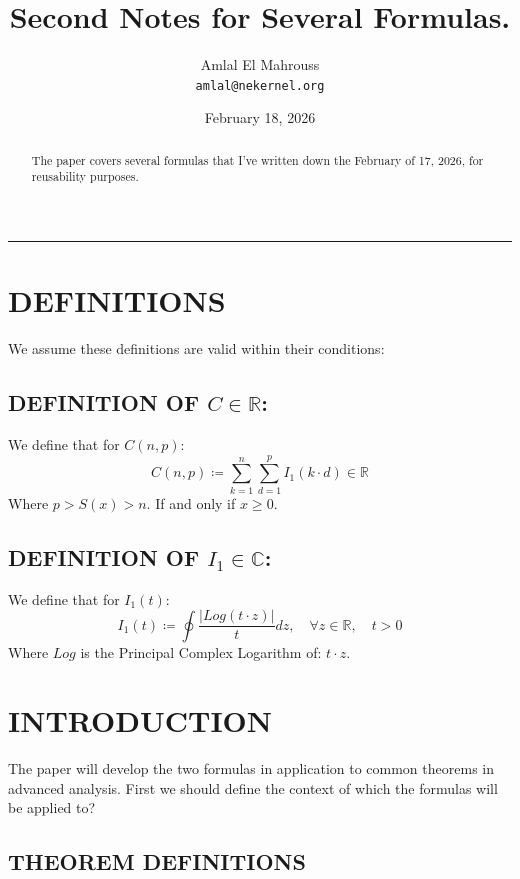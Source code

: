 \documentclass[11pt, a4paper]{article}
\title{Second Notes for Several Formulas.}
\author{Amlal El Mahrouss\\\texttt{amlal@nekernel.org}}
\date{February 18, 2026}
\begin{document}
\maketitle

\begin{center}
	\rule[0.01cm]{17cm}{0.01cm}
\end{center}

\begin{abstract}
\begin{center}
    The paper covers several formulas that I've written down the February of 17, 2026, for reusability purposes.
\end{center}
\end{abstract}

\section{DEFINITIONS}

We assume these definitions are valid within their conditions:

\subsection{DEFINITION OF $C \in \mathbb{R}$:}
We define that for $C(n, p)$:
\begin{equation}
C(n, p) \coloneq \sum_{k=1}^{n} \sum_{d=1}^{p} I_{1} (k \cdot d) \in \mathbb{R}
\end{equation}
Where $p > S(x) > n$. If and only if $x \geq 0$.

\subsection{DEFINITION OF $I_{1} \in \mathbb{C}$:}
We define that for $I_{1}(t)$:
\begin{equation}
I_{1}(t) \coloneq \oint \frac{|Log(t\cdot z)|}{t}dz, \quad \forall z \in \mathbb{R}, \quad t > 0
\end{equation}
Where $Log$ is the Principal Complex Logarithm of: $t \cdot z$.

\section{INTRODUCTION}

The paper will develop the two formulas in application to common theorems in advanced analysis. First we should define the context of which the formulas will be applied to?

\subsection{THEOREM DEFINITIONS}
\end{document}
